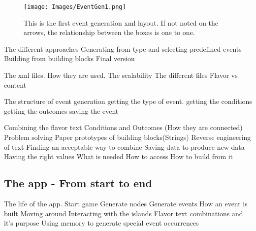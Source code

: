 \begin{figure}[h]
    \centering
    \texttt{[image: Images/EventGen1.png]}
    \caption{This is the first event generation xml layout. If not noted on the arrows, the relationship between the boxes is one to one.}
    \label{fig:eGen1}
\end{figure}



The different approaches
Generating from type and selecting predefined events
Building from building blocks
Final version

The xml files.
How they are used. The scalability 
The different files
Flavor vs content

The structure of event generation
getting the type of event.
getting the conditions
getting the outcomes
saving the event


Combining the flavor text
Conditions and Outcomes (How they are connected)
Problem solving
Paper prototypes of building blocks(Strings)
Reverse engineering of text
Finding an acceptable way to combine
Saving data to produce new data
Having the right values
What is needed
How to access
How to build from it
\subsection{The app - From start to end}
The life of the app. 
Start game 
Generate nodes
Generate events
How an event is built
Moving around
Interacting with the islands
Flavor text combinations and it's purpose
Using memory to generate special event occurrences
